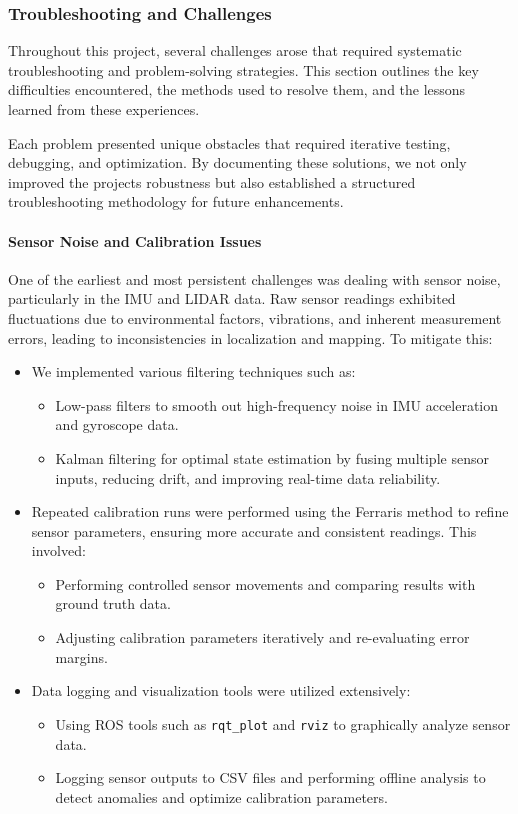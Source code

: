 \documentclass[english,project]{buwthesis}
\begin{document}
\subsubsection{Troubleshooting and Challenges}
Throughout this project, several challenges arose that required systematic troubleshooting and problem-solving strategies. This section outlines the key difficulties encountered, the methods used to resolve them, and the lessons learned from these experiences. 

Each problem presented unique obstacles that required iterative testing, debugging, and optimization. By documenting these solutions, we not only improved the project\textquotesingle s robustness but also established a structured troubleshooting methodology for future enhancements.

\paragraph{Sensor Noise and Calibration Issues}
One of the earliest and most persistent challenges was dealing with sensor noise, particularly in the IMU and LIDAR data. Raw sensor readings exhibited fluctuations due to environmental factors, vibrations, and inherent measurement errors, leading to inconsistencies in localization and mapping.
\sloppy
To mitigate this:
\begin{itemize}
\item We implemented various filtering techniques such as:
  \begin{itemize}
    \item Low-pass filters to smooth out high-frequency noise in IMU acceleration and gyroscope data.
    \item Kalman filtering for optimal state estimation by fusing multiple sensor inputs, reducing drift, and improving real-time data reliability.
  \end{itemize}
\item Repeated calibration runs were performed using the Ferraris method to refine sensor parameters, ensuring more accurate and consistent readings. This involved:
  \begin{itemize}
    \item Performing controlled sensor movements and comparing results with ground truth data.
    \item Adjusting calibration parameters iteratively and re-evaluating error margins.
  \end{itemize}
\item Data logging and visualization tools were utilized extensively:
  \begin{itemize}
    \item Using ROS tools such as \texttt{rqt\_plot} and \texttt{rviz} to graphically analyze sensor data.
    \item Logging sensor outputs to CSV files and performing offline analysis to detect anomalies and optimize calibration parameters.
  \end{itemize}
\end{itemize}
\end{document}
